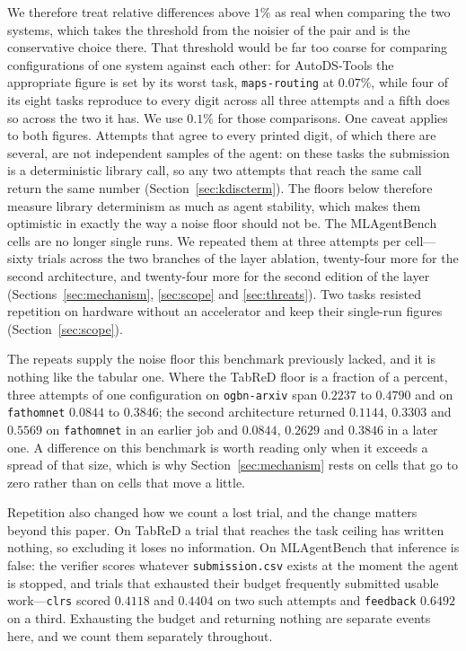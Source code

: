 We therefore treat relative differences above $1\%$ as real when comparing the
two systems, which takes the threshold from the noisier of the pair and is the
conservative choice there. That threshold would be far too coarse for comparing
configurations of one system against each other: for AutoDS-Tools the
appropriate figure is set by its worst task, \texttt{maps-routing} at
$0.07\%$, while four of its eight tasks reproduce to every digit across all
three attempts and a fifth does so across the two it has. We use $0.1\%$ for those comparisons. One caveat applies to both figures.
Attempts that agree to every printed digit, of which there are several, are not
independent samples of the agent: on these tasks the submission is a
deterministic library call, so any two attempts that reach the same call return
the same number (Section~\ref{sec:kdiscterm}). The floors below therefore
measure library determinism as much as agent stability, which makes them
optimistic in exactly the way a noise floor should not be. The MLAgentBench cells are no longer single runs. We repeated them at three
attempts per cell---sixty trials across the two branches of the layer ablation,
twenty-four more for the second architecture, and twenty-four more for the second
edition of the layer (Sections~\ref{sec:mechanism}, \ref{sec:scope} and
\ref{sec:threats}). Two tasks resisted repetition on hardware without an
accelerator and keep their single-run figures (Section~\ref{sec:scope}).

The repeats supply the noise floor this benchmark previously lacked, and it is
nothing like the tabular one. Where the TabReD floor is a fraction of a percent,
three attempts of one configuration on \texttt{ogbn-arxiv} span $0.2237$ to
$0.4790$ and on \texttt{fathomnet} $0.0844$ to $0.3846$; the second architecture
returned $0.1144$, $0.3303$ and $0.5569$ on \texttt{fathomnet} in an earlier job
and $0.0844$, $0.2629$ and $0.3846$ in a later one. A difference on this
benchmark is worth reading only when it exceeds a spread of that size, which is
why Section~\ref{sec:mechanism} rests on cells that go to zero rather than on
cells that move a little.

Repetition also changed how we count a lost trial, and the change matters beyond
this paper. On TabReD a trial that reaches the task ceiling has written nothing,
so excluding it loses no information. On MLAgentBench that inference is false:
the verifier scores whatever \texttt{submission.csv} exists at the moment the
agent is stopped, and trials that exhausted their budget frequently submitted
usable work---\texttt{clrs} scored $0.4118$ and $0.4404$ on two such attempts and
\texttt{feedback} $0.6492$ on a third. Exhausting the budget and returning
nothing are separate events here, and we count them separately throughout.

